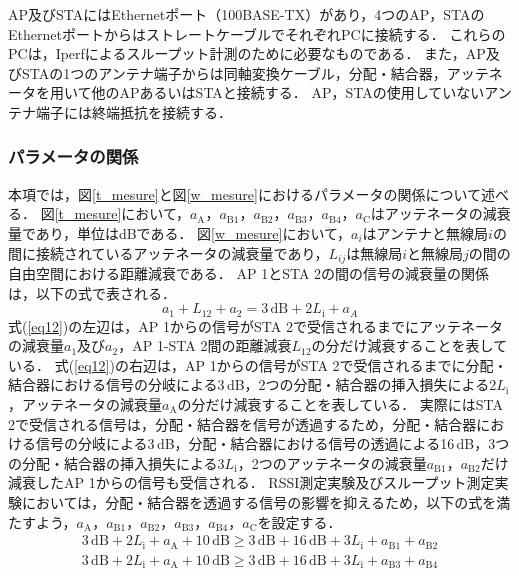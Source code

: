 \documentclass[master]{kuisthesis}		%
\begin{document}
AP及びSTAにはEthernetポート（100BASE-TX）があり，4つのAP，STAのEthernetポートからはストレートケーブルでそれぞれPCに接続する．
これらのPCは，Iperfによるスループット計測のために必要なものである．
また，AP及びSTAの1つのアンテナ端子からは同軸変換ケーブル，分配・結合器，アッテネータを用いて他のAPあるいはSTAと接続する．
AP，STAの使用していないアンテナ端子には終端抵抗を接続する．

\subsubsection{パラメータの関係}\label{aa}
本項では，図\ref{t_mesure}と図\ref{w_mesure}におけるパラメータの関係について述べる．
図\ref{t_mesure}において，$a_\mathrm{A}$，$a_\mathrm{B1}$，$a_\mathrm{B2}$，$a_\mathrm{B3}$，$a_\mathrm{B4}$，$a_\mathrm{C}$はアッテネータの減衰量であり，単位はdBである．
図\ref{w_mesure}において，$a_i$はアンテナと無線局$i$の間に接続されているアッテネータの減衰量であり，$L_{ij}$は無線局$i$と無線局$j$の間の自由空間における距離減衰である．
AP 1とSTA 2の間の信号の減衰量の関係は，以下の式で表される．
\begin{equation}
a_1 + L_{12} +a_2 = 3\,\mathrm{dB} +2L_{\mathrm{i}} + a_A 
\label{eq12}
\end{equation}
式(\ref{eq12})の左辺は，AP 1からの信号がSTA 2で受信されるまでにアッテネータの減衰量$a_1$及び$a_2$，AP 1-STA 2間の距離減衰$L_{12}$の分だけ減衰することを表している．
式(\ref{eq12})の右辺は，AP 1からの信号がSTA 2で受信されるまでに分配・結合器における信号の分岐による3\,dB，2つの分配・結合器の挿入損失による$2L_{\mathrm{i}}$，アッテネータの減衰量$a_\mathrm{A}$の分だけ減衰することを表している．
実際にはSTA 2で受信される信号は，分配・結合器を信号が透過するため，分配・結合器における信号の分岐による3\,dB，分配・結合器における信号の透過による16\,dB，3つの分配・結合器の挿入損失による$3L_{\mathrm{i}}$，2つのアッテネータの減衰量$a_\mathrm{B1}$，$a_\mathrm{B2}$だけ減衰したAP 1からの信号も受信される．
RSSI測定実験及びスループット測定実験においては，分配・結合器を透過する信号の影響を抑えるため，以下の式を満たすよう，$a_\mathrm{A}$，$a_\mathrm{B1}$，$a_\mathrm{B2}$，$a_\mathrm{B3}$，$a_\mathrm{B4}$，$a_\mathrm{C}$を設定する．
\begin{align}
3\,\mathrm{dB} +2L_{\mathrm{i}} + a_\mathrm{A} + 10\,\mathrm{dB} \geq 3\,\mathrm{dB} + 16\,\mathrm{dB} + 3L_{\mathrm{i}} + a_\mathrm{B1} + a_\mathrm{B2}\\
3\,\mathrm{dB} +2L_{\mathrm{i}} + a_\mathrm{A} + 10\,\mathrm{dB} \geq 3\,\mathrm{dB} + 16\,\mathrm{dB} + 3L_{\mathrm{i}} + a_\mathrm{B3} + a_\mathrm{B4}
\end{align}
\end{document}

